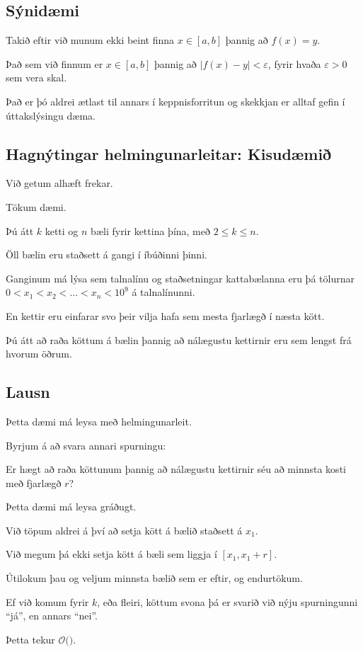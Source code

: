 \subsection{Sýnidæmi}
{
    {
        \item<1-> Takið eftir við munum ekki beint finna $x \in [a, b]$ þannig að $f(x) = y$.
        \item<2-> Það sem við finnum er $x \in [a, b]$ þannig að $|f(x) - y| < \varepsilon$, fyrir hvaða $\varepsilon > 0$ sem vera skal.
        \item<3-> Það er þó aldrei ætlast til annars í keppnisforritun og skekkjan er alltaf gefin í úttakslýsingu dæma.
    }
}

\subsection{Hagnýtingar helmingunarleitar: Kisudæmið}
{
    {
        \item<1-> Við getum alhæft frekar.
        \item<2-> Tökum dæmi.
        \item<3-> Þú átt $k$ ketti og $n$ bæli fyrir kettina þína, með $2 \leq k \leq n$.
        \item<4-> Öll bælin eru staðsett á gangi í íbúðinni þinni.
        \item<5-> Ganginum má lýsa sem talnalínu og staðsetningar kattabælanna eru þá tölurnar 
                    $0 < x_1 < x_2 < ... < x_n < 10^9$ á talnalínunni.
        \item<6-> En kettir eru einfarar svo þeir vilja hafa sem mesta fjarlægð í næsta kött.
        \item<7-> Þú átt að raða köttum á bælin þannig að nálægustu kettirnir eru sem lengst frá hvorum öðrum.
    }
}

\subsection{Lausn}
{
    {
        \item<1-> Þetta dæmi má leysa með helmingunarleit.
        \item<2-> Byrjum á að svara annari spurningu:
        {
            \item<3-> Er hægt að raða köttunum þannig að nálægustu kettirnir séu að minnsta kosti með fjarlægð $r$?
        }
        \item<4-> Þetta dæmi má leysa gráðugt.
        \item<5-> Við töpum aldrei á því að setja kött á bælið staðsett á $x_1$.
        \item<6-> Við megum þá ekki setja kött á bæli sem liggja í $[x_1, x_1 + r]$.
        \item<7-> Útilokum þau og veljum minnsta bælið sem er eftir, og endurtökum.
        \item<8-> Ef við komum fyrir $k$, eða fleiri, köttum svona þá er svarið við nýju spurningunni ``já'', en annars ``nei''.
        \item<9-> Þetta tekur $\mathcal{O}($$)$.
    }
}

